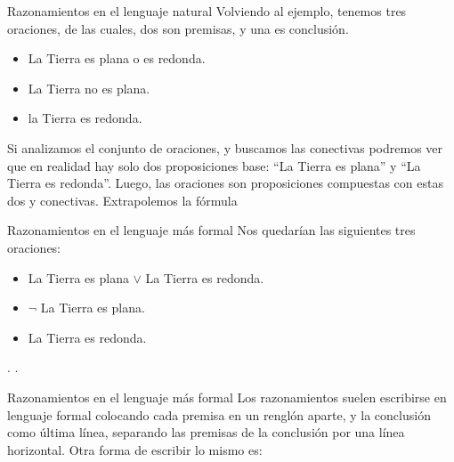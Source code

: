 
\begin{frame}{Razonamientos en el lenguaje natural}
  Volviendo al ejemplo, tenemos tres oraciones, de las cuales,
  dos son premisas, y una es conclusión.
  \jump
  \begin{itemize}
    \item La Tierra es plana o es redonda.
    \item La Tierra no es plana.
    \item la Tierra es redonda.
  \end{itemize}
  \jump
  Si analizamos el conjunto de oraciones, y buscamos las conectivas
  podremos ver que en realidad hay solo dos proposiciones base:
  ``La Tierra es plana'' y ``La Tierra es redonda''. Luego, las
  oraciones son proposiciones compuestas con estas dos y conectivas.
  \jump
  Extrapolemos la fórmula
\end{frame}


\begin{frame}{Razonamientos en el lenguaje más formal}
  Nos quedarían las siguientes tres oraciones:
  \begin{itemize}
    \item La Tierra es plana $\lor$ La Tierra es redonda.
    \item $\lnot$ La Tierra es plana.
    \item La Tierra es redonda.
  \end{itemize}
  \jump
  .
  \jump
  .
\end{frame}


\begin{frame}{Razonamientos en el lenguaje más formal}
  Los razonamientos suelen escribirse en lenguaje formal colocando cada
  premisa en un renglón aparte, y la conclusión como última línea, separando
  las premisas de la conclusión por una línea horizontal.
  \jump
  \jump
  Otra forma de escribir lo mismo es:
  \jump
\end{frame}

